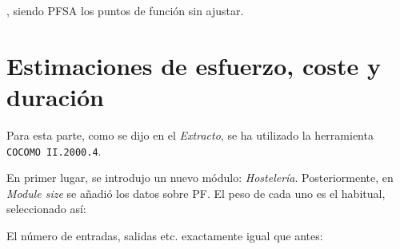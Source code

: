 \documentclass[spanish,a4paper,11pt, twoside]{report}	%
\begin{document}
	, siendo PFSA los puntos de función sin ajustar.
	

\newpage
\mbox{}
\thispagestyle{empty}						%
\newpage
\setcounter{section}{0}

\part{Estimaciones de esfuerzo, coste y duración} %
Para esta parte, como se dijo en el \textit{Extracto}, se ha utilizado la herramienta \texttt{COCOMO II.2000.4}.

En primer lugar, se introdujo un nuevo módulo: \textit{Hostelería}. Posteriormente, en \textit{Module size} se añadió los datos sobre PF. El peso de cada uno es el habitual, seleccionado así:

\vspace{0.35cm}
\hspace{3.5cm}
\vspace{0.35cm}

El número de entradas, salidas etc. exactamente igual que antes:
\end{document}
